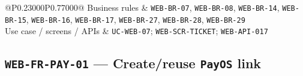 \begin{longtable}{@{}P{0.23000\SRSWidth}P{0.77000\SRSWidth}@{}}
Business rules & \texttt{WEB-\allowbreak{}BR-\allowbreak{}07}, \texttt{WEB-\allowbreak{}BR-\allowbreak{}08}, \texttt{WEB-\allowbreak{}BR-\allowbreak{}14}, \texttt{WEB-\allowbreak{}BR-\allowbreak{}15}, \texttt{WEB-\allowbreak{}BR-\allowbreak{}16}, \texttt{WEB-\allowbreak{}BR-\allowbreak{}17}, \texttt{WEB-\allowbreak{}BR-\allowbreak{}27}, \texttt{WEB-\allowbreak{}BR-\allowbreak{}28}, \texttt{WEB-\allowbreak{}BR-\allowbreak{}29} \\[3pt]
Use case /\allowbreak{} screens /\allowbreak{} APIs & \texttt{UC-\allowbreak{}WEB-\allowbreak{}07}; \texttt{WEB-\allowbreak{}SCR-\allowbreak{}TICKET}; \texttt{WEB-\allowbreak{}API-\allowbreak{}017} \\[3pt]
\end{longtable}
\endgroup

\subsection{\texttt{WEB-\allowbreak{}FR-\allowbreak{}PAY-\allowbreak{}01} — Create/\allowbreak{}reuse \texttt{Pay\allowbreak{}OS} link}
\begingroup
\fontsize{9.5}{12}\selectfont
\setlength{\SRSWidth}{\dimexpr\linewidth-2\tabcolsep\relax}
